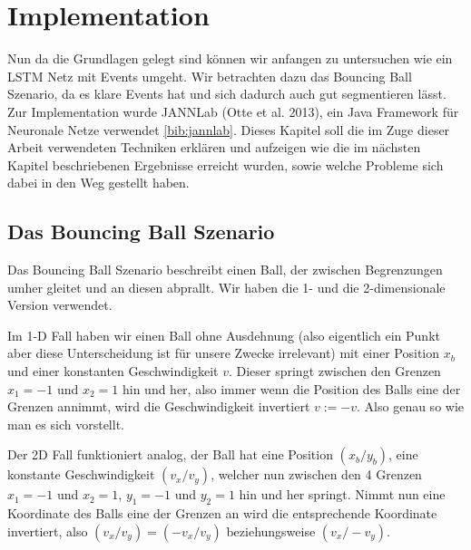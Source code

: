 \chapter{Implementation}
Nun da die Grundlagen gelegt sind können wir anfangen zu untersuchen wie ein LSTM Netz mit Events umgeht. Wir betrachten dazu das Bouncing Ball Szenario, da es klare Events hat und sich dadurch auch gut segmentieren lässt. Zur Implementation wurde JANNLab (Otte et al. 2013), ein Java Framework für Neuronale Netze verwendet \ref{bib:jannlab}. Dieses Kapitel soll die im Zuge dieser Arbeit verwendeten Techniken erklären und aufzeigen wie die im nächsten Kapitel beschriebenen Ergebnisse erreicht wurden, sowie welche Probleme sich dabei in den Weg gestellt haben.

\section{Das Bouncing Ball Szenario}
Das Bouncing Ball Szenario beschreibt einen Ball, der zwischen Begrenzungen umher gleitet und an diesen abprallt. Wir haben die 1- und die 2-dimensionale Version verwendet.

Im 1-D Fall haben wir einen Ball ohne Ausdehnung (also eigentlich ein Punkt aber diese Unterscheidung ist für unsere Zwecke irrelevant) mit einer Position $ x_{b} $ und einer konstanten Geschwindigkeit $  v$. Dieser springt zwischen den Grenzen $ x_{1}=-1 $ und $ x_{2}=1 $ hin und her, also immer wenn die Position des Balls eine der Grenzen annimmt, wird die Geschwindigkeit invertiert $ v := -v $. Also genau so wie man es sich vorstellt.

Der 2D Fall funktioniert analog, der Ball hat eine Position $ (x_{b}/y_{b}) $, eine konstante Geschwindigkeit $ (v_{x}/v_{y}) $, welcher nun zwischen den 4 Grenzen $ x_{1}=-1 $ und $ x_{2}=1 $, $ y_{1}=-1 $ und $ y_{2}=1 $ hin und her springt. Nimmt nun eine Koordinate des Balls eine der Grenzen an wird die entsprechende Koordinate invertiert, also $ (v_{x}/v_{y}) = (-v_{x}/v_{y}) $ beziehungsweise $ (v_{x}/-v_{y}) $. 

